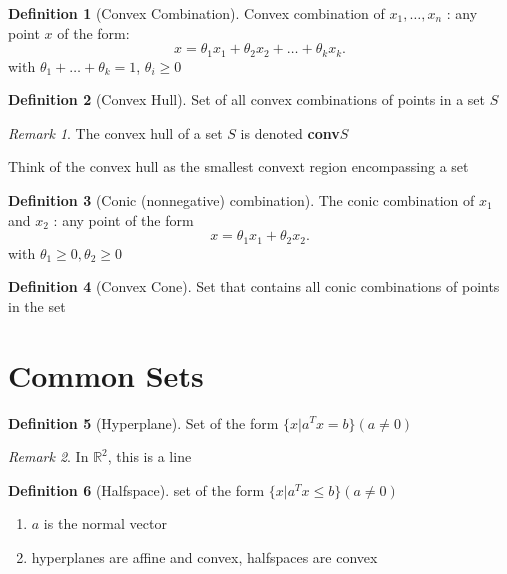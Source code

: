 \documentclass{report}
\theoremstyle{remark} \newtheorem{remark}{Remark}[section]
\theoremstyle{definition}
\newtheorem{definition}{Definition}[section]
\theoremstyle{definition}
\theoremstyle{definition}
\theoremstyle{remark}
\begin{document}
\begin{definition}[Convex Combination]
    Convex combination of $x_1, \ldots, x_n$ : any point $x$ of the form:
    \[
    x = \theta_1 x_1 + \theta_2 x_2 + \ldots + \theta_k x_k
    .\] 
    with $\theta_1 + \ldots + \theta_k = 1$, $\theta_i \ge 0$
\end{definition}


\begin{definition}[Convex Hull]
    Set of all convex combinations of points in a set $S$
       
\end{definition}

\begin{remark}
    The convex hull of a set $S$ is denoted \textbf{conv}$S$   
\end{remark}

Think of the convex hull as the smallest convext region encompassing a set

\begin{definition}[Conic (nonnegative) combination]
    The conic combination of $x_1$ and $x_2$ : any point of the form
    \[
    x = \theta_1 x_1 + \theta_2 x_2
    .\] 
     with $\theta_1 \ge 0, \theta_2 \ge 0$  
\end{definition}

\begin{definition}[Convex Cone]
      Set that contains all conic combinations of points in the set 
\end{definition}

\section{Common Sets}

\begin{definition}[Hyperplane]
    Set of the form $\{x | a^{T}x = b\}(a \neq 0)$
       
\end{definition}

\begin{remark}
    In $\mathbb{R}^2$, this is a line   
\end{remark}

\begin{definition}[Halfspace]
    set of the form $\{x | a^{T}x \le b\}(a \neq 0)$
\end{definition}

\begin{enumerate}
    \item $a$ is the normal vector 
        \item hyperplanes are affine and convex, halfspaces are convex
\end{enumerate}
\end{document}
